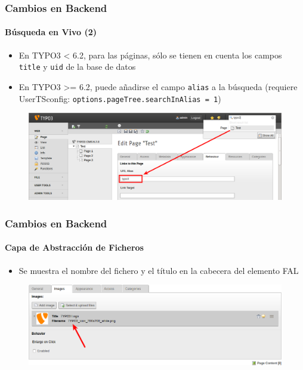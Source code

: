 
\begin{frame}[fragile]
	\frametitle{Cambios en Backend}
	\framesubtitle{Búsqueda en Vivo (2)}

	\begin{itemize}
		\item En TYPO3 < 6.2, para las páginas, sólo se tienen en cuenta los campos \texttt{title} y \texttt{uid} de la base de datos
		\item En TYPO3 >= 6.2, puede añadirse el campo \texttt{alias} a la búsqueda\newline
			(requiere UserTSconfig: \texttt{options.pageTree.searchInAlias = 1})
	\end{itemize}

	\begin{figure}
		\includegraphics[width=0.95\linewidth]{Images/BackendChanges/LiveSearchInAlias.png}
	\end{figure}

\end{frame}


\begin{frame}[fragile]
	\frametitle{Cambios en Backend}
	\framesubtitle{Capa de Abstracción de Ficheros}

	\begin{itemize}
		\item Se muestra el nombre del fichero y el título en la cabecera del elemento FAL
	\end{itemize}

	\begin{figure}
		\includegraphics[width=0.95\linewidth]{Images/BackendChanges/FalTitleAndFilename.png}
	\end{figure}

\end{frame}

